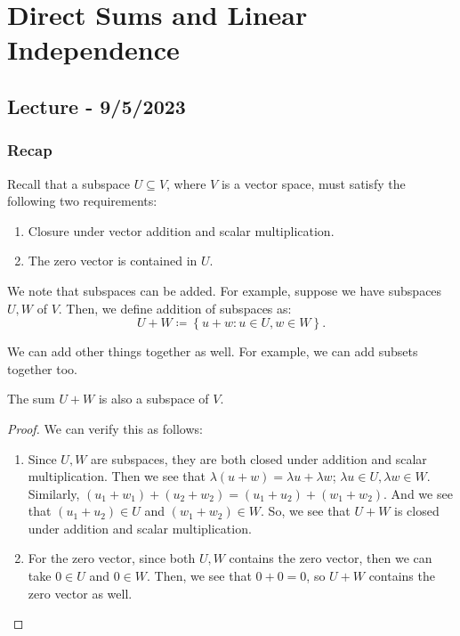 \documentclass[openany]{book}
\begin{document}
	\chapter{Direct Sums and Linear Independence}
	\section{Lecture - 9/5/2023}
	\subsection{Recap}
	Recall that a subspace $U \subseteq V$, where $V$ is a vector space, must satisfy the following two requirements:
	\begin{enumerate}
		\item Closure under vector addition and scalar multiplication.
		\item The zero vector is contained in $U$.
	\end{enumerate}
	
	We note that subspaces can be added. For example, suppose we have subspaces $U, W$ of $V$. Then, we define addition of subspaces as:
	\begin{equation*}
		U + W \coloneq \left\{  u + w : u \in U, w \in W \right\}.
	\end{equation*}
	
	\begin{rmk}
		We can add other things together as well. For example, we can add subsets together too.
	\end{rmk}
	
	\begin{thm}
		The sum $U+W$ is also a subspace of $V$.
	\end{thm}
	\begin{proof}
		We can verify this as follows:
		\begin{enumerate}
			\item Since $U, W$ are subspaces, they are both closed under addition and scalar multiplication. Then we see that $\lambda(u + w) = \lambda u + \lambda w$; $\lambda u \in U, \lambda w \in W$. Similarly, $(u_{1} + w_{1}) + (u_{2} + w_{2}) = (u_{1} + u_{2}) + (w_{1} + w_{2})$. And we see that $(u_{1} + u_{2}) \in U$ and $(w_{1} + w_{2}) \in W$. So, we see that $U+W$ is closed under addition and scalar multiplication.
			
			\item For the zero vector, since both $U, W$ contains the zero vector, then we can take $0 \in U$ and $0 \in W$. Then, we see that $0 + 0 = 0$, so $U+W$ contains the zero vector as well.
		\end{enumerate}
	\end{proof}
	
\end{document}

